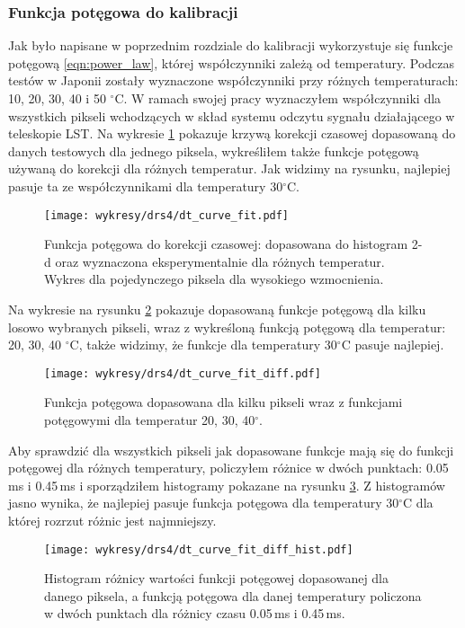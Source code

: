 \documentclass[a4paper,11pt,twoside]{article}
\begin{document}
\subsubsection{Funkcja potęgowa do kalibracji}
Jak było napisane w poprzednim rozdziale do kalibracji wykorzystuje się funkcje potęgową \ref{eqn:power_law}, której współczynniki zależą od temperatury. Podczas testów w Japonii zostały wyznaczone współczynniki przy różnych temperaturach: 10, 20, 30, 40 i 50 $^\circ$C. W ramach swojej pracy wyznaczyłem  współczynniki dla wszystkich pikseli wchodzących w skład systemu odczytu sygnału działającego w teleskopie LST. Na wykresie \ref{fig:dt_curve_fit_all_temp} pokazuje krzywą korekcji czasowej dopasowaną do danych testowych dla jednego piksela, wykreśliłem także funkcje potęgową używaną do korekcji dla różnych temperatur. Jak widzimy na rysunku, najlepiej pasuje ta ze współczynnikami dla temperatury 30$^{\circ}$C. 
\begin{figure}[H] 
\centering
\texttt{[image: wykresy/drs4/dt\_curve\_fit.pdf]}
\caption{Funkcja potęgowa do korekcji czasowej: dopasowana do histogram 2-d oraz wyznaczona eksperymentalnie dla różnych temperatur. Wykres dla  pojedynczego piksela dla wysokiego wzmocnienia.}
\label{fig:dt_curve_fit_all_temp}
\end{figure}
Na wykresie na rysunku \ref{fig:dt_curve_fit_few_pixels} pokazuje dopasowaną funkcje potęgową dla kilku losowo wybranych pikseli, wraz z wykreśloną funkcją potęgową dla temperatur: 20, 30, 40 $^{\circ}$C, także widzimy, że funkcje dla temperatury 30$^{\circ}$C pasuje najlepiej.
\begin{figure}[H] 
\centering
\texttt{[image: wykresy/drs4/dt\_curve\_fit\_diff.pdf]}
\caption{Funkcja potęgowa dopasowana dla kilku pikseli wraz z funkcjami potęgowymi dla temperatur 20, 30, 40$^{\circ}$.}
\label{fig:dt_curve_fit_few_pixels}
\end{figure}
Aby sprawdzić dla wszystkich pikseli jak dopasowane funkcje mają się do funkcji potęgowej dla różnych temperatury, policzyłem różnice w dwóch punktach: 0.05\,ms i 0.45\,ms i sporządziłem histogramy pokazane na rysunku \ref{fig:dt_curve_hist}. Z histogramów jasno wynika, że najlepiej pasuje funkcja potęgowa dla temperatury 30$^{\circ}$C dla której rozrzut różnic jest najmniejszy.
\begin{figure}[H] 
\centering
\texttt{[image: wykresy/drs4/dt\_curve\_fit\_diff\_hist.pdf]}
\caption{Histogram różnicy wartości funkcji potęgowej dopasowanej dla danego piksela, a funkcją potęgowa dla danej temperatury policzona w dwóch punktach dla różnicy czasu 0.05\,ms i 0.45\,ms.}
\label{fig:dt_curve_hist}
\end{figure}
\end{document}
